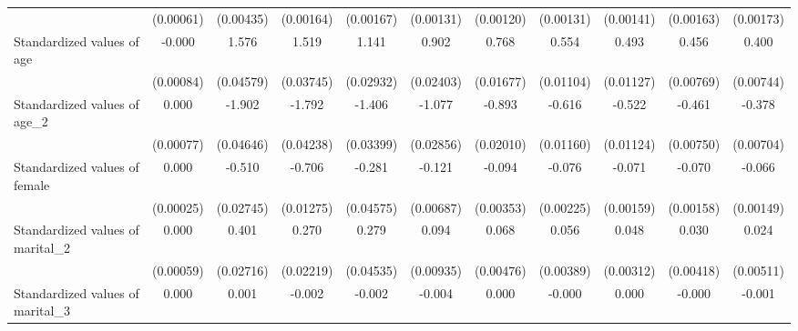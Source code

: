 {\begin{tabular}{l*{10}{c}}
                    &   (0.00061)         &   (0.00435)         &   (0.00164)         &   (0.00167)         &   (0.00131)         &   (0.00120)         &   (0.00131)         &   (0.00141)         &   (0.00163)         &   (0.00173)         \\
Standardized values of age&      -0.000         &       1.576\sym{***}&       1.519\sym{***}&       1.141\sym{***}&       0.902\sym{***}&       0.768\sym{***}&       0.554\sym{***}&       0.493\sym{***}&       0.456\sym{***}&       0.400\sym{***}\\
                    &   (0.00084)         &   (0.04579)         &   (0.03745)         &   (0.02932)         &   (0.02403)         &   (0.01677)         &   (0.01104)         &   (0.01127)         &   (0.00769)         &   (0.00744)         \\
Standardized values of age\_2&       0.000         &      -1.902\sym{***}&      -1.792\sym{***}&      -1.406\sym{***}&      -1.077\sym{***}&      -0.893\sym{***}&      -0.616\sym{***}&      -0.522\sym{***}&      -0.461\sym{***}&      -0.378\sym{***}\\
                    &   (0.00077)         &   (0.04646)         &   (0.04238)         &   (0.03399)         &   (0.02856)         &   (0.02010)         &   (0.01160)         &   (0.01124)         &   (0.00750)         &   (0.00704)         \\
Standardized values of female&       0.000         &      -0.510\sym{***}&      -0.706\sym{***}&      -0.281\sym{***}&      -0.121\sym{***}&      -0.094\sym{***}&      -0.076\sym{***}&      -0.071\sym{***}&      -0.070\sym{***}&      -0.066\sym{***}\\
                    &   (0.00025)         &   (0.02745)         &   (0.01275)         &   (0.04575)         &   (0.00687)         &   (0.00353)         &   (0.00225)         &   (0.00159)         &   (0.00158)         &   (0.00149)         \\
Standardized values of marital\_2&       0.000         &       0.401\sym{***}&       0.270\sym{***}&       0.279\sym{***}&       0.094\sym{***}&       0.068\sym{***}&       0.056\sym{***}&       0.048\sym{***}&       0.030\sym{***}&       0.024\sym{***}\\
                    &   (0.00059)         &   (0.02716)         &   (0.02219)         &   (0.04535)         &   (0.00935)         &   (0.00476)         &   (0.00389)         &   (0.00312)         &   (0.00418)         &   (0.00511)         \\
Standardized values of marital\_3&       0.000         &       0.001\sym{***}&      -0.002\sym{***}&      -0.002\sym{***}&      -0.004\sym{***}&       0.000\sym{**} &      -0.000         &       0.000\sym{*}  &      -0.000\sym{***}&      -0.001\sym{***}\\

\end{tabular}}
